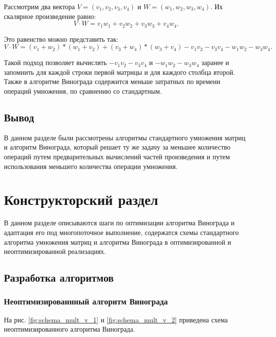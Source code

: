 \documentclass[a4paper,14pt]{article}
\begin{document}
	Рассмотрим два вектора $V = (v_1, v_2, v_3, v_4)$ и $W = (w_1, w_2, w_3, w_4)$. Их скалярное произведение равно:
	\[
	 V \cdot W = v_1w_1 + v_2w_2 + v_3w_3 + v_4w_4.
	\]
	
	Это равенство можно представить так:
	\[
	 V \cdot W = (v_1 + w_2) * (w_1 + v_2) + (v_3 + w_4)*(w_3 + v_4) - v_1v_2 - v_3v_4 - w_1w_2 - w_3w_4.
	 \]	 
	 
	Такой подход позволяет вычислять $ - v_1v_2 - v_3v_4$ и $ - w_1w_2 - w_3w_4$ заранее и запомнить для каждой строки первой матрицы и для каждого столбца второй. Также в алгоритме Винограда содержится меньше затратных по времени операций умножения, по сравнению со стандартным\cite{makkonell}.
	

	    
		\subsection*{Вывод}
		В данном разделе были рассмотрены алгоритмы стандартного умножения матриц и алгоритм Винограда, который решает ту же задачу за меньшее количество операций путем предварительных вычислений частей произведения и путем использования меньшего количества операции умножения. 


\pagebreak


\section{Конструкторский раздел}
	В данном разделе описываются шаги по оптимизации алгоритма Винограда и адаптация его под многопоточное выполнение, содержатся схемы стандартного алгоритма умножения матриц и алгоритма Винограда в оптимизированной и неоптимизированной реализациях.
	
        
    \subsection{Разработка алгоритмов}
    \subsubsection{Неоптимизированнный алгоритм Винограда}
    
        На рис. \ref{fig:schema_mult_v_1} и \ref{fig:schema_mult_v_2} приведена схема неоптимизированного алгоритма Винограда.
        
        
        
\end{document}
